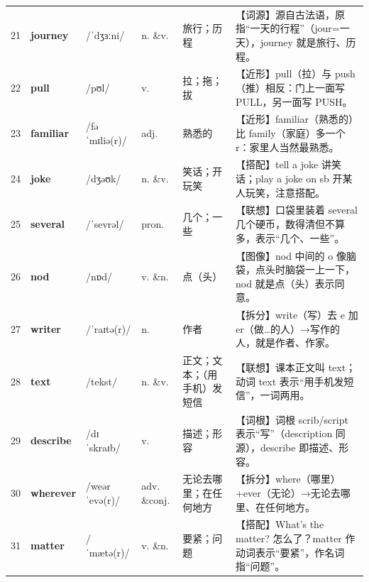 \documentclass[UTF8,a4paper,11pt,oneside]{ctexbook}
\newcommand{\cellword}[1]{{\bfseries\textcolor{wordcol}{#1}}}
\newcommand{\cellipa}[1]{{\footnotesize\textcolor{ipacol}{#1}}}
\newcommand{\cellpos}[1]{\textcolor{poscol}{#1}}
\newcommand{\cellno}[1]{\textcolor{volcolor!75!black}{#1}}
\begin{document}
{\begin{longtable}{@{}C{0.045\textwidth}L{0.155\textwidth}L{0.175\textwidth}C{0.070\textwidth}L{0.180\textwidth}L{0.282\textwidth}@{}}
 \cellno{21} & \cellword{journey} & \cellipa{/ˈdʒɜːni/} & \cellpos{n. \&v.} & 旅行；历程 & \textcolor{tagEtym}{【词源】}源自古法语，原指“一天的行程”（jour=一天），journey 就是旅行、历程。 \\
\cellno{22} & \cellword{pull} & \cellipa{/pʊl/} & \cellpos{v.} & 拉；拖；拔 & \textcolor{tagNear}{【近形】}pull（拉）与 push（推）相反：门上一面写 PULL，另一面写 PUSH。 \\
 \cellno{23} & \cellword{familiar} & \cellipa{/fəˈmɪliə(r)/} & \cellpos{adj.} & 熟悉的 & \textcolor{tagNear}{【近形】}familiar（熟悉的）比 family（家庭）多一个 r：家里人当然最熟悉。 \\
\cellno{24} & \cellword{joke} & \cellipa{/dʒəʊk/} & \cellpos{n. \&v.} & 笑话；开玩笑 & \textcolor{tagColloc}{【搭配】}tell a joke 讲笑话；play a joke on sb 开某人玩笑，注意搭配。 \\
 \cellno{25} & \cellword{several} & \cellipa{/ˈsevrəl/} & \cellpos{pron.} & 几个；一些 & \textcolor{tagAssoc}{【联想】}口袋里装着 several 几个硬币，数得清但不算多，表示“几个、一些”。 \\
\cellno{26} & \cellword{nod} & \cellipa{/nɒd/} & \cellpos{v. \&n.} & 点（头） & \textcolor{tagImage}{【图像】}nod 中间的 o 像脑袋，点头时脑袋一上一下，nod 就是点（头）表示同意。 \\
 \cellno{27} & \cellword{writer} & \cellipa{/ˈraɪtə(r)/} & \cellpos{n.} & 作者 & \textcolor{tagSplit}{【拆分】}write（写）去 e 加 er（做…的人）→\allowbreak{}写作的人，就是作者、作家。 \\
\cellno{28} & \cellword{text} & \cellipa{/tekst/} & \cellpos{n. \&v.} & 正文；文本；（用手机）发短信 & \textcolor{tagAssoc}{【联想】}课本正文叫 text；动词 text 表示“用手机发短信”，一词两用。 \\
 \cellno{29} & \cellword{describe} & \cellipa{/dɪˈskraɪb/} & \cellpos{v.} & 描述；形容 & \textcolor{tagRoot}{【词根】}词根 scrib/script 表示“写”（description 同源），describe 即描述、形容。 \\
\cellno{30} & \cellword{wherever} & \cellipa{/weərˈevə(r)/} & \cellpos{adv. \&conj.} & 无论去哪里；在任何地方 & \textcolor{tagSplit}{【拆分】}where（哪里）+ever（无论）→\allowbreak{}无论去哪里、在任何地方。 \\
 \cellno{31} & \cellword{matter} & \cellipa{/ˈmætə(r)/} & \cellpos{v. \&n.} & 要紧；问题 & \textcolor{tagColloc}{【搭配】}What's the matter? 怎么了？matter 作动词表示“要紧”，作名词指“问题”。 \\

\end{longtable}}
\end{document}
